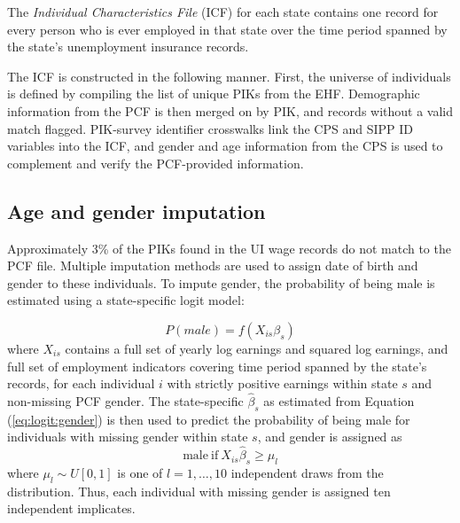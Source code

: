 
%
%

\label{sec:icf_overview}

The \textit{Individual Characteristics File }(ICF)%
for each state contains one record for every
person who is ever employed in that state over the time period spanned by
the state's unemployment insurance records. 

The ICF is constructed in the following manner. First, the universe of
individuals is defined by compiling the list of unique PIKs from the
EHF. Demographic information from the PCF is then merged on by PIK, and
records without a valid match flagged. PIK-survey identifier
crosswalks link the CPS and SIPP ID variables into the ICF, and gender and
age information from the CPS is used to complement and verify the
PCF-provided information. 

\subsection{Age and gender imputation}

Approximately 3{\%} of the PIKs found in the UI
wage records do not match to the PCF file. Multiple imputation
methods are used to assign  date of birth and gender
to these individuals. To impute gender, the probability of being male is
estimated using a state-specific logit
model:

\begin{equation}
  \label{eq:logit:gender}
  P(male)=f(X_{is}\beta_s)
\end{equation}
where $X_{is}$ contains a  full set of yearly log earnings and squared log
earnings, and full set of employment indicators covering time period spanned
by the state's records, for each individual $i$ with strictly positive earnings
within state $s$ and non-missing PCF gender. The state-specific $\hat{\beta}_s$ as estimated from Equation
(\ref{eq:logit:gender}) is then used to predict the probability of
being male for individuals with missing gender  within state $s$, and gender is assigned as
\begin{equation}
  \label{eq:impute:gender}
  \text{male}~\text{if}~X_{is}\hat{\beta}_s \geq \mu_l 
\end{equation}
where $\mu_l \sim U[0,1]$ is one of  $l = 1,\dots,10$ independent draws
from the distribution. Thus, each individual with missing gender is
assigned ten independent implicates.

